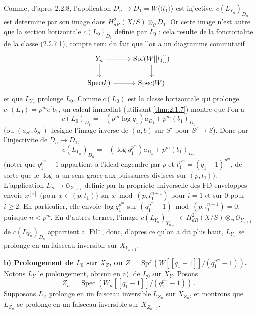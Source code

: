 \documentclass[12pt,a4paper]{article}
\theoremstyle{plain}
\theoremstyle{definition}
\theoremstyle{remark}
\DeclareMathOperator{\Spf}{Spf}
\DeclareMathOperator{\Spec}{Spec}
\DeclareMathOperator{\Fil}{Fil}
\begin{document}
Comme, d'apres 2.2.8, l'application $D_n \to D_1 = W\langle\langle t_1 \rangle\rangle$ est injective, $c(L_{Y_n})_{D_n}$ est determine par son image dans $H_{dR}^2(X/S) \otimes_\mathcal{O} D_1$. Or cette image n'est autre que la section horizontale $c(L_0)_{D_1}$ definie par $L_0$ : cela resulte de la fonctorialite de la classe (2.2.7.1), compte tenu du fait que l'on a un diagramme commutatif
\[
\begin{tikzcd}
Y_n \rar \dar & \Spf(W[[t_1]]) \dar \\
\Spec(k) \rar & \Spec(W)
\end{tikzcd}
\]
et que $L_{Y_n}$ prolonge $L_0$. Comme $c(L_0)$ est la classe horizontale qui prolonge $c_1(L_0) = p^me^*b_1$, un calcul immediat (utilisant \ref{thm:2.1.7}) montre que l'on a
\[
c(L_0)_{D_1} = -(p^m \log q_1)a_{D_1} + p^m(b_1)_{D_1}
\]
(ou $(a_{S'}, b_{S'})$ designe l'image inverse de $(a, b)$ sur $S'$ pour $S' \to S$). Donc par l'injectivite de $D_n \to D_1$,
\[
c(L_{Y_n})_{D_n} = -(\log q_1^{p^m})a_{D_n} + p^m(b_1)_{D_n}
\]
(noter que $q_1^{p^m} - 1$ appartient a l'ideal engendre par $p$ et $t_1^{p^m} = (q_1-1)^{p^m}$, de sorte que le $\log$ a un sens grace aux puissances divisees sur $(p, t_1)$). L'application $D_n \to \mathcal{O}_{Y_{n+1}}$ definie par la propriete universelle des PD-enveloppes envoie $x^{[i]}$ (pour $x \in (p, t_1)$) sur $x \bmod (p, t_1^{n+1})$ pour $i = 1$ et sur $0$ pour $i \geq 2$. En particulier, elle envoie $\log q_1^{p^m}$ sur $(q_1^{p^m} - 1) \bmod (p, t_1^{n+1}) = 0$, puisque $n < p^m$. En d'autres termes, l'image $c(L_{Y_n})_{Y_{n+1}} \in H_{dR}^2(X/S) \otimes_\mathcal{O} \mathcal{O}_{Y_{n+1}}$ de $c(L_{Y_n})_{D_n}$ appartient a $\Fil^1$, donc, d'apres ce qu'on a dit plus haut, $L_{Y_n}$ se prolonge en un faisceau inversible sur $X_{Y_{n+1}}$.

\textbf{b) Prolongement de $L_0$ sur $X_Z$, ou $Z = \Spf(W[[q_1-1]]/(q_1^{p^m} - 1))$.} Notons $L_{Y}$ le prolongement, obtenu en a), de $L_0$ sur $X_Y$. Posons
\[
Z_n = \Spec(W_n[[q_1-1]]/(q_1^{p^m} - 1))\,.\]
Supposons $L_Z$ prolonge en un faisceau inversible $L_{Z_n}$ sur $X_{Z_n}$, et montrons que $L_{Z_n}$ se prolonge en un faisceau inversible sur $X_{Z_{n+1}}$.
\end{document}
